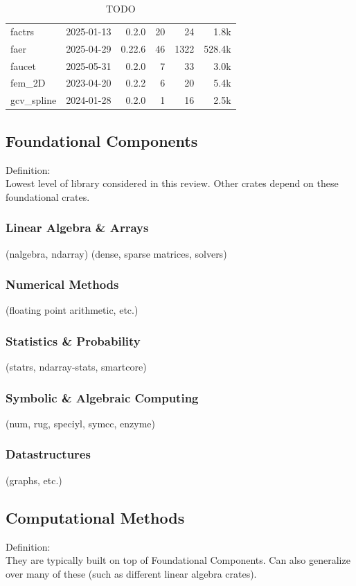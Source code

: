 \documentclass{article}
\begin{document}
\begin{table}
\begin{tabular}{l r r r r r}
        factrs           &2025-01-13 &0.2.0      &20   &24       &      1.8k\\
        faer             &2025-04-29 &0.22.6     &46   &1322     &    528.4k\\
        faucet           &2025-05-31 &0.2.0      &7    &33       &      3.0k\\
        fem\_2D          &2023-04-20 &0.2.2      &6    &20       &      5.4k\\
        gcv\_spline      &2024-01-28 &0.2.0      &1    &16       &      2.5k\\
        \bottomrule
    \end{tabular}
    \caption{TODO}
\end{table}

\subsection{Foundational Components}
Definition:\\
Lowest level of library considered in this review. Other crates depend on these
foundational crates.

\subsubsection{Linear Algebra \& Arrays}
(nalgebra, ndarray) (dense, sparse matrices, solvers)

\subsubsection{Numerical Methods}
(floating point arithmetic, etc.)

\subsubsection{Statistics \& Probability}
(statrs, ndarray-stats, smartcore)

\subsubsection{Symbolic \& Algebraic Computing}
(num, rug, speciyl, symcc, enzyme)

\subsubsection{Datastructures}
(graphs, etc.)

\subsection{Computational Methods}
Definition:\\
They are typically built on top of Foundational Components. Can also generalize over
many of these (such as different linear algebra crates).
\end{document}
